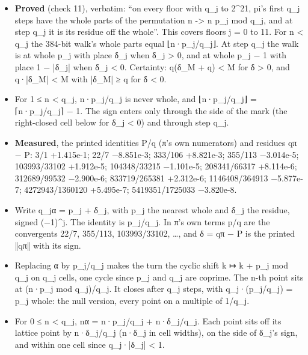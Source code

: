 \begin{itemize}
\begin{itemize}
\item \textbf{Proved} (check 11), verbatim: “on every floor with q\_\allowbreak{}j to 2\textasciicircum{}21, pi's first q\_\allowbreak{}j steps have the whole parts of the permutation n -> n p\_\allowbreak{}j mod q\_\allowbreak{}j, and at step q\_\allowbreak{}j it is its residue off the whole”. This covers floors j = 0 to 11. For n < q\_\allowbreak{}j the 384-bit walk's whole parts equal ⌊n·p\_\allowbreak{}j/q\_\allowbreak{}j⌋. At step q\_\allowbreak{}j the walk is at whole p\_\allowbreak{}j with place δ\_\allowbreak{}j when δ\_\allowbreak{}j > 0, and at whole p\_\allowbreak{}j − 1 with place 1 − |δ\_\allowbreak{}j| when δ\_\allowbreak{}j < 0. Certainty: q(δ\_\allowbreak{}M + q) < M for δ > 0, and q·|δ\_\allowbreak{}M| < M with |δ\_\allowbreak{}M| ≥ q for δ < 0.
\item For 1 ≤ n < q\_\allowbreak{}j, n·p\_\allowbreak{}j/q\_\allowbreak{}j is never whole, and ⌊n·p\_\allowbreak{}j/q\_\allowbreak{}j⌋ = ⌈n·p\_\allowbreak{}j/q\_\allowbreak{}j⌉ − 1. The sign enters only through the side of the mark (the right-closed cell below for δ\_\allowbreak{}j < 0) and through step q\_\allowbreak{}j.
\item \textbf{Measured}, the printed identities P/q (π's own numerators) and residues qπ − P: 3/1 +1.415e-1; 22/7 −8.851e-3; 333/106 +8.821e-3; 355/113 −3.014e-5; 103993/33102 +1.912e-5; 104348/33215 −1.101e-5; 208341/66317 +8.114e-6; 312689/99532 −2.900e-6; 833719/265381 +2.312e-6; 1146408/364913 −5.877e-7; 4272943/1360120 +5.495e-7; 5419351/1725033 −3.820e-8.
\item Write q\_\allowbreak{}jα = p\_\allowbreak{}j + δ\_\allowbreak{}j, with p\_\allowbreak{}j the nearest whole and δ\_\allowbreak{}j the residue, signed (−1)\textasciicircum{}j. The identity is p\_\allowbreak{}j/q\_\allowbreak{}j. In π's own terms p/q are the convergents 22/7, 355/113, 103993/33102, …, and δ = qπ − P is the printed ‖qπ‖ with its sign.
\item Replacing α by p\_\allowbreak{}j/q\_\allowbreak{}j makes the turn the cyclic shift k ↦ k + p\_\allowbreak{}j mod q\_\allowbreak{}j on q\_\allowbreak{}j cells, one cycle since p\_\allowbreak{}j and q\_\allowbreak{}j are coprime. The n-th point sits at (n·p\_\allowbreak{}j mod q\_\allowbreak{}j)/q\_\allowbreak{}j. It closes after q\_\allowbreak{}j steps, with q\_\allowbreak{}j·(p\_\allowbreak{}j/q\_\allowbreak{}j) = p\_\allowbreak{}j whole: the null version, every point on a multiple of 1/q\_\allowbreak{}j.
\item For 0 ≤ n < q\_\allowbreak{}j, nα = n·p\_\allowbreak{}j/q\_\allowbreak{}j + n·δ\_\allowbreak{}j/q\_\allowbreak{}j. Each point sits off its lattice point by n·δ\_\allowbreak{}j/q\_\allowbreak{}j (n·δ\_\allowbreak{}j in cell widths), on the side of δ\_\allowbreak{}j's sign, and within one cell since q\_\allowbreak{}j·|δ\_\allowbreak{}j| < 1.

\end{itemize}
\end{itemize}
